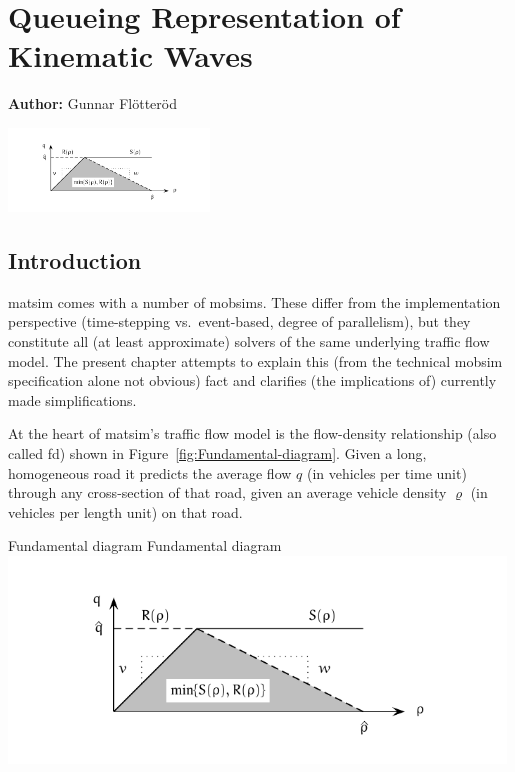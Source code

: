 \chapter{Queueing Representation of Kinematic Waves}
\label{ch:kinematicwaves}

\hfill \textbf{Author:} Gunnar Flötteröd

\begin{center} \includegraphics[width=0.4\textwidth, angle=0]{understanding/figures/waves/fig0.pdf} \end{center}

\section{\label{sec:Introduction}Introduction}

\gls{matsim} comes with a number of \glspl{mobsim}. These differ from the
implementation perspective (time-stepping vs.\ event-based, degree
of parallelism), but they constitute all (at least approximate) solvers
of the same underlying traffic flow model. The present chapter attempts
to explain this (from the technical mobsim specification alone not
obvious) fact and clarifies (the implications of) currently made simplifications.

At the heart of \gls{matsim}'s traffic flow model is the flow-density relationship
(also called \gls{fd}) shown in Figure~\ref{fig:Fundamental-diagram}.
Given a long, homogeneous
road it predicts the average flow $q$ (in vehicles per time unit)
through any cross-section of that road, given an average vehicle density
$\varrho$ (in vehicles per length unit) on that road. 

\createfigure%
{Fundamental diagram}%
{Fundamental diagram}%
{\label{fig:Fundamental-diagram}}%
{\includegraphics[width=0.99\textwidth, angle=0]{understanding/figures/waves/fig0.pdf}}%
{}

